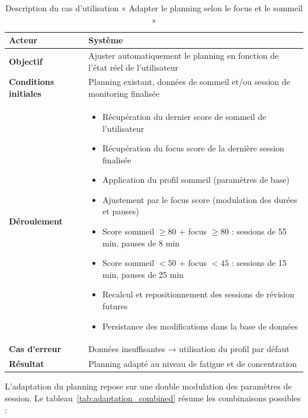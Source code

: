 \begin{table}[H]
\centering
\renewcommand{\arraystretch}{1.2}
\begin{tabular}{|p{4cm}|p{10cm}|}
\hline
\textbf{Acteur} & Système \\ \hline

\textbf{Objectif} & Ajuster automatiquement le planning en fonction de l'état réel de l'utilisateur \\ \hline

\textbf{Conditions initiales} & Planning existant, données de sommeil et/ou session de monitoring finalisée \\ \hline

\textbf{Déroulement} &
\begin{itemize}
    \item Récupération du dernier score de sommeil de l'utilisateur
    \item Récupération du focus score de la dernière session finalisée
    \item Application du profil sommeil (paramètres de base)
    \item Ajustement par le focus score (modulation des durées et pauses)
    \item Score sommeil $\geq 80$ + focus $\geq 80$ : sessions de 55 min, pauses de 8 min
    \item Score sommeil $< 50$ + focus $< 45$ : sessions de 15 min, pauses de 25 min
    \item Recalcul et repositionnement des sessions de révision futures
    \item Persistance des modifications dans la base de données
\end{itemize} \\ \hline

\textbf{Cas d'erreur} & Données insuffisantes → utilisation du profil par défaut \\ \hline

\textbf{Résultat} & Planning adapté au niveau de fatigue et de concentration \\ \hline
\end{tabular}
\caption{Description du cas d'utilisation « Adapter le planning selon le focus et le sommeil »}
\label{tab:uc_adapt}
\end{table}

L'adaptation du planning repose sur une double modulation des paramètres de session. Le tableau~\ref{tab:adaptation_combined} résume les combinaisons possibles :

